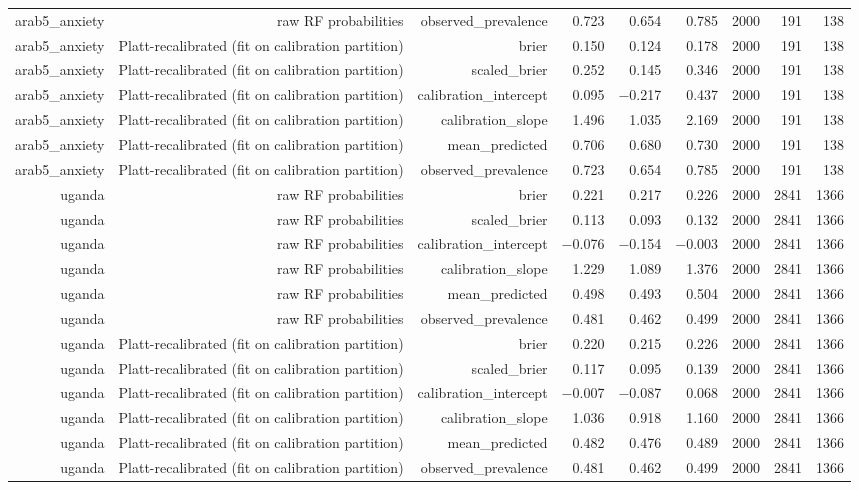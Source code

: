 \documentclass[10pt]{article}
\begin{document}
\begin{longtable}{rrrrrrrrr}
arab5\_anxiety & raw RF probabilities & observed\_prevalence & 0.723 & 0.654 & 0.785 & 2000 & 191 & 138 \\
arab5\_anxiety & Platt-recalibrated (fit on calibration partition) & brier & 0.150 & 0.124 & 0.178 & 2000 & 191 & 138 \\
arab5\_anxiety & Platt-recalibrated (fit on calibration partition) & scaled\_brier & 0.252 & 0.145 & 0.346 & 2000 & 191 & 138 \\
arab5\_anxiety & Platt-recalibrated (fit on calibration partition) & calibration\_intercept & 0.095 & $-$0.217 & 0.437 & 2000 & 191 & 138 \\
arab5\_anxiety & Platt-recalibrated (fit on calibration partition) & calibration\_slope & 1.496 & 1.035 & 2.169 & 2000 & 191 & 138 \\
arab5\_anxiety & Platt-recalibrated (fit on calibration partition) & mean\_predicted & 0.706 & 0.680 & 0.730 & 2000 & 191 & 138 \\
arab5\_anxiety & Platt-recalibrated (fit on calibration partition) & observed\_prevalence & 0.723 & 0.654 & 0.785 & 2000 & 191 & 138 \\
uganda & raw RF probabilities & brier & 0.221 & 0.217 & 0.226 & 2000 & 2841 & 1366 \\
uganda & raw RF probabilities & scaled\_brier & 0.113 & 0.093 & 0.132 & 2000 & 2841 & 1366 \\
uganda & raw RF probabilities & calibration\_intercept & $-$0.076 & $-$0.154 & $-$0.003 & 2000 & 2841 & 1366 \\
uganda & raw RF probabilities & calibration\_slope & 1.229 & 1.089 & 1.376 & 2000 & 2841 & 1366 \\
uganda & raw RF probabilities & mean\_predicted & 0.498 & 0.493 & 0.504 & 2000 & 2841 & 1366 \\
uganda & raw RF probabilities & observed\_prevalence & 0.481 & 0.462 & 0.499 & 2000 & 2841 & 1366 \\
uganda & Platt-recalibrated (fit on calibration partition) & brier & 0.220 & 0.215 & 0.226 & 2000 & 2841 & 1366 \\
uganda & Platt-recalibrated (fit on calibration partition) & scaled\_brier & 0.117 & 0.095 & 0.139 & 2000 & 2841 & 1366 \\
uganda & Platt-recalibrated (fit on calibration partition) & calibration\_intercept & $-$0.007 & $-$0.087 & 0.068 & 2000 & 2841 & 1366 \\
uganda & Platt-recalibrated (fit on calibration partition) & calibration\_slope & 1.036 & 0.918 & 1.160 & 2000 & 2841 & 1366 \\
uganda & Platt-recalibrated (fit on calibration partition) & mean\_predicted & 0.482 & 0.476 & 0.489 & 2000 & 2841 & 1366 \\
uganda & Platt-recalibrated (fit on calibration partition) & observed\_prevalence & 0.481 & 0.462 & 0.499 & 2000 & 2841 & 1366 \\
\bottomrule
\end{longtable}
\normalsize
\end{document}
